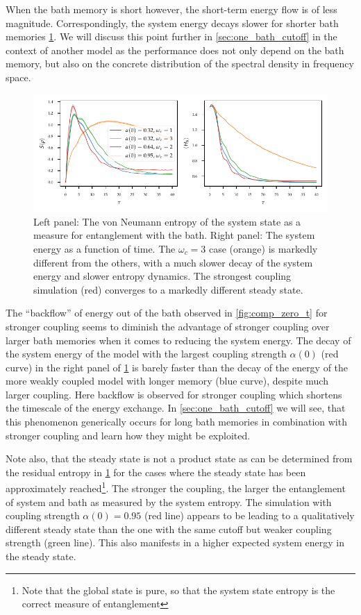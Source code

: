 When the bath memory is short however, the short-term energy flow is
of less magnitude. Correspondingly, the system energy decays slower
for shorter bath memories \cref{fig:ho_zero_entropy}. We will discuss
this point further in \cref{sec:one_bath_cutoff} in the context of
another model as the performance does not only depend on the bath
memory, but also on the concrete distribution of the spectral density
in frequency space.

\begin{figure}[htp]
  \centering
  \includegraphics{figs/analytic_comp/entropy_zero.pdf}
  \caption{\label{fig:ho_zero_entropy} Left panel: The von Neumann
    entropy of the system state as a measure for entanglement with the
    bath. Right panel: The system energy as a function of time. The
    \(ω_{c}=3\) case (orange) is markedly different from the others,
    with a much slower decay of the system energy and slower entropy
    dynamics. The strongest coupling simulation (red) converges to a
    markedly different steady state.}
\end{figure}
The ``backflow'' of energy out of the bath observed in
\cref{fig:comp_zero_t} for stronger coupling seems to diminish the
advantage of stronger coupling over larger bath memories when it comes
to reducing the system energy. The decay of the system energy of the
model with the largest coupling strength \(α(0)\) (red curve) in the
right panel of \cref{fig:ho_zero_entropy} is barely faster than the
decay of the energy of the more weakly coupled model with longer
memory (blue curve), despite much larger coupling. Here backflow is
observed for stronger coupling which shortens the timescale of the
energy exchange. In \cref{sec:one_bath_cutoff} we will see, that this
phenomenon generically occurs for long bath memories in combination
with stronger coupling and learn how they might be exploited.

Note also, that the steady state is not a product state as can be
determined from the residual entropy in \cref{fig:ho_zero_entropy} for
the cases where the steady state has been approximately
reached\footnote{Note that the global state is pure, so that the
  system state entropy is the correct measure of entanglement}. The
stronger the coupling, the larger the entanglement of system and bath
as measured by the system entropy. The simulation with coupling
strength \(α(0)=0.95\) (red line) appears to be leading to a
qualitatively different steady state than the one with the same cutoff
but weaker coupling strength (green line). This also manifests in a
higher expected system energy in the steady state.

